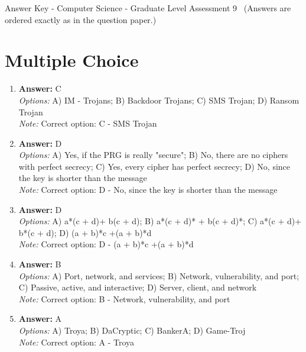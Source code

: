 \documentclass[12pt]{article}
\begin{document}
\begin{center}
Answer Key - Computer Science - Graduate Level Assessment 9 \
\small (Answers are ordered exactly as in the question paper.)
\end{center}

\section*{Multiple Choice}
\begin{enumerate}[label=\arabic*.]
\item \textbf{Answer:} C
\\ \textit{Options:} A) IM - Trojans; B) Backdoor Trojans; C) SMS Trojan; D) Ransom Trojan
\\ \textit{Note:} Correct option: C - SMS Trojan
\item \textbf{Answer:} D
\\ \textit{Options:} A) Yes, if the PRG is really "secure"; B) No, there are no ciphers with perfect secrecy; C) Yes, every cipher has perfect secrecy; D) No, since the key is shorter than the message
\\ \textit{Note:} Correct option: D - No, since the key is shorter than the message
\item \textbf{Answer:} D
\\ \textit{Options:} A) a*(c + d)+ b(c + d); B) a*(c + d)* + b(c + d)*; C) a*(c + d)+ b*(c + d); D) (a + b)*c +(a + b)*d
\\ \textit{Note:} Correct option: D - (a + b)*c +(a + b)*d
\item \textbf{Answer:} B
\\ \textit{Options:} A) Port, network, and services; B) Network, vulnerability, and port; C) Passive, active, and interactive; D) Server, client, and network
\\ \textit{Note:} Correct option: B - Network, vulnerability, and port
\item \textbf{Answer:} A
\\ \textit{Options:} A) Troya; B) DaCryptic; C) BankerA; D) Game-Troj
\\ \textit{Note:} Correct option: A - Troya
\end{enumerate}
\end{document}
